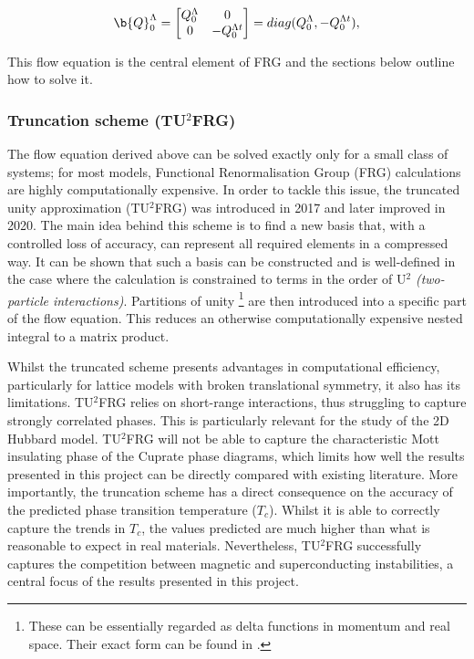 \documentclass[12pt]{article}
\begin{document}
\begin{equation}\label{Q0 term }
\b{Q}_0^{\Lambda} =
\begin{bmatrix}
Q_0^{\Lambda} & 0 \\
0 & -Q_0^{\Lambda t}
\end{bmatrix}
= diag(Q_0^{\Lambda}, - Q_0^{\Lambda t}),
\end{equation}

\noindent This flow equation is the central element of FRG and the sections below outline how to solve it.


\subsubsection{Truncation scheme (TU$^2$FRG)}
\label{subsubsec:Truncation scheme}


The flow equation derived above can be solved exactly only for a small class of systems; for most models, Functional Renormalisation Group (FRG) 
calculations are highly computationally expensive.
In order to tackle this issue, the truncated unity approximation (TU$^2$FRG) was introduced in 2017\cite{lichtenstein2017high} and later improved in 2020\cite{eckhardt2020truncated}. 
The main idea behind this scheme is to find a new basis that, with a controlled loss of accuracy, can represent all 
required elements in a compressed way. It can be shown that such a basis can be constructed and is 
well-defined in the case where the calculation is constrained to terms in the order of U$^{2}$ \textit{(two-particle interactions)}\cite{lichtenstein2018functional}.
Partitions of unity \footnote{These can be essentially regarded as delta functions in momentum and real space. Their exact form can be found in \cite{lichtenstein2018functional}.} are then introduced into a specific part of the flow equation. This reduces an otherwise computationally expensive nested integral to a matrix product.\par
\medskip

\noindent Whilst the truncated scheme presents advantages in computational efficiency, particularly for lattice models with broken translational symmetry, it also has its limitations. 
TU$^2$FRG relies on short-range interactions, thus struggling to capture strongly correlated phases. 
This is particularly relevant for the study of the 2D Hubbard model. TU$^2$FRG will not be able to capture
the characteristic Mott insulating phase of the Cuprate phase diagrams\cite{imada1998metal}, which limits how well the results presented in this project can be directly compared with existing literature. 
More importantly, the truncation scheme has a direct consequence on the accuracy of the predicted phase transition temperature ($T_c$). Whilst it is able to correctly capture
the trends in $T_c$, the values predicted are much higher than what is reasonable to expect in real materials.
Nevertheless, TU$^2$FRG successfully captures the competition between magnetic and superconducting instabilities, a central focus of the results presented in this project. 
\end{document}
